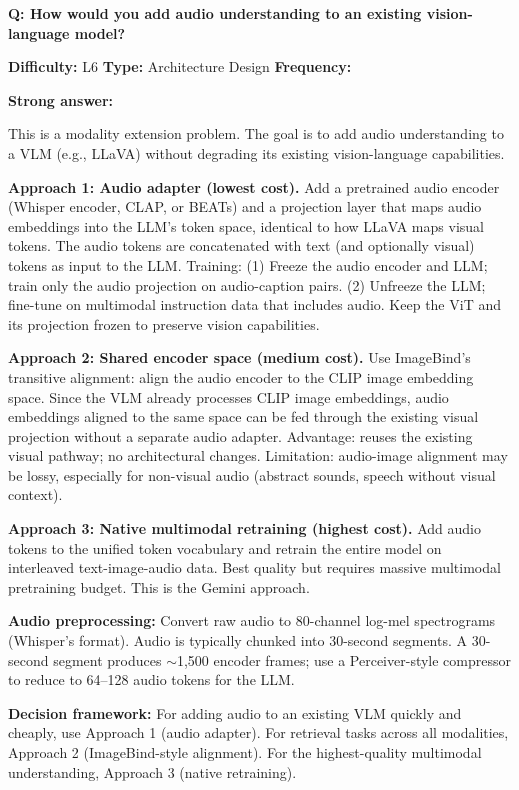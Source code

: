 \begin{interviewq}
\textbf{Q: How would you add audio understanding to an existing vision-language model?}

\textbf{Difficulty:} L6 \quad \textbf{Type:} Architecture Design \quad \textbf{Frequency:} \freqlow{}

\textbf{Strong answer:}

This is a modality extension problem. The goal is to add audio understanding to a VLM (e.g., LLaVA) without degrading its existing vision-language capabilities.

\textbf{Approach 1: Audio adapter (lowest cost).} Add a pretrained audio encoder (Whisper encoder, CLAP, or BEATs) and a projection layer that maps audio embeddings into the LLM's token space, identical to how LLaVA maps visual tokens. The audio tokens are concatenated with text (and optionally visual) tokens as input to the LLM. Training: (1) Freeze the audio encoder and LLM; train only the audio projection on audio-caption pairs. (2) Unfreeze the LLM; fine-tune on multimodal instruction data that includes audio. Keep the ViT and its projection frozen to preserve vision capabilities.

\textbf{Approach 2: Shared encoder space (medium cost).} Use ImageBind's transitive alignment: align the audio encoder to the CLIP image embedding space. Since the VLM already processes CLIP image embeddings, audio embeddings aligned to the same space can be fed through the existing visual projection without a separate audio adapter. Advantage: reuses the existing visual pathway; no architectural changes. Limitation: audio-image alignment may be lossy, especially for non-visual audio (abstract sounds, speech without visual context).

\textbf{Approach 3: Native multimodal retraining (highest cost).} Add audio tokens to the unified token vocabulary and retrain the entire model on interleaved text-image-audio data. Best quality but requires massive multimodal pretraining budget. This is the Gemini approach.

\textbf{Audio preprocessing:} Convert raw audio to 80-channel log-mel spectrograms (Whisper's format). Audio is typically chunked into 30-second segments. A 30-second segment produces $\sim$1,500 encoder frames; use a Perceiver-style compressor to reduce to 64--128 audio tokens for the LLM.

\textbf{Decision framework:} For adding audio to an existing VLM quickly and cheaply, use Approach 1 (audio adapter). For retrieval tasks across all modalities, Approach 2 (ImageBind-style alignment). For the highest-quality multimodal understanding, Approach 3 (native retraining).


\end{interviewq}
